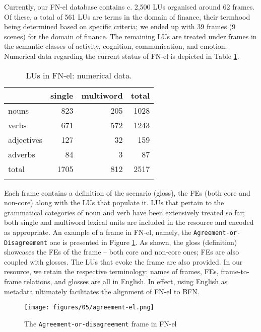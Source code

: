 \documentclass[output=paper,colorlinks,citecolor=brown]{langscibook}
\begin{document}
Currently, our FN-el database contains c. 2,500 LUs organised around 62 frames. Of these, a total of 561 LUs are terms in the domain of finance, their term\-hood being determined based on specific criteria; we ended up with 39 frames (9 scenes) for the domain of finance. The remaining LUs are treated under frames in the semantic classes of activity, cognition, communication, and emotion. Numerical data regarding the current status of FN-el is depicted in Table \ref{tab:FN-el-nubers}.


\begin{table}
\caption{LUs in FN-el: numerical data.}
\label{tab:FN-el-nubers}
 \begin{tabular}{l rrr}
  \lsptoprule
            & single & multiword  & total\\
  \midrule
  nouns  &   823  &    205  &    1028\\
  verbs  &   671 &   572  &    1243\\
  adjectives  &   127 &   32  &    159\\
  adverbs  &   84 &   3  &    87\\
  total  &   1705 &   812  &    2517\\
  \lspbottomrule
 \end{tabular}
\end{table}

Each frame contains a definition of the scenario (gloss), the FEs (both core and non-core) along with the LUs that populate it. LUs that pertain to the grammatical categories of noun and verb have been extensively treated so far; both single and multiword lexical units are included in the resource and encoded as appropriate. An example of a frame in FN-el, namely, the \texttt{Agreement-or-Disagreement} one is presented in Figure \ref{fig:agreement-el}. As shown, the gloss (definition) showcases the FEs of the frame -- both core and non-core ones; FEs are also coupled with glosses. The LUs that evoke the frame are also provided. In our resource, we retain the respective terminology: names of frames, FEs, frame-to-frame relations, and glosses are all in English. In effect, using English as metadata ultimately facilitates the alignment of FN-el to BFN.

\begin{figure}
    \centering
    \texttt{[image: figures/05/agreement-el.png]}
    \caption{The \texttt{Agreement-or-disagreement} frame in FN-el}
    \label{fig:agreement-el}
\end{figure}
\end{document}
